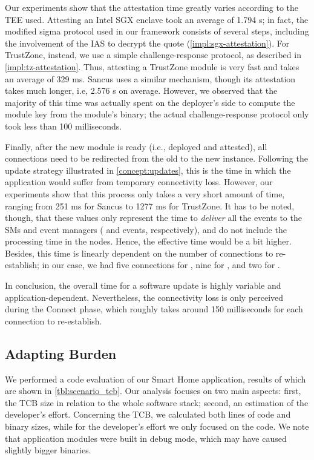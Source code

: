 Our experiments show that the attestation time greatly varies according to the
\ac{TEE} used. Attesting an Intel \ac{SGX} enclave took an average of
1.794 s; in fact, the modified sigma protocol used in our framework
consists of several steps, including the involvement of the \ac{IAS} to decrypt
the quote (\cref{impl:sgx-attestation}). For TrustZone, instead, we use a simple
challenge-response protocol, as described in \cref{impl:tz-attestation}. Thus,
attesting a TrustZone module is very fast and takes an average of 329
ms. Sancus uses a similar mechanism, though its attestation takes much longer,
i.e, 2.576 s on average. However, we observed that the majority of this
time was actually spent on the deployer's side to compute the module key from
the module's binary; the actual challenge-response protocol only took less than
100 milliseconds.

Finally, after the new module is ready (i.e., deployed and attested), all
connections need to be redirected from the old to the new instance. Following
the update strategy illustrated in \cref{concept:updates}, this is the time in
which the application would suffer from temporary connectivity loss. However,
our experiments show that this process only takes a very short amount of time,
ranging from 251 ms for Sancus to 1277 ms for TrustZone. It has to be noted,
though, that these values only represent the time to \emph{deliver} all the
events to the \acp{SM} and event managers (\setkey{} and \addconnection{}
events, respectively), and do not include the processing time in the nodes.
Hence, the effective time would be a bit higher. Besides, this time is linearly
dependent on the number of connections to re-establish; in our case, we had five
connections for \web, nine for \gateway, and two for \tempsensor.

In conclusion, the overall time for a software update is highly variable and
application-dependent. Nevertheless, the connectivity loss is only perceived
during the Connect phase, which roughly takes around 150 milliseconds for each
connection to re-establish.

\subsection{Adapting Burden}
\label{eval:macrob}



We performed a code evaluation of our Smart Home application, results of which
are shown in \cref{tbl:scenario_tcb}. Our analysis focuses on two main aspects:
first, the \ac{TCB} size in relation to the whole software stack; second, an
estimation of the developer's effort. Concerning the \ac{TCB}, we calculated
both lines of code and binary sizes, while for the developer's effort we only
focused on the code. We note that application modules were built in debug mode,
which may have caused slightly bigger binaries.

